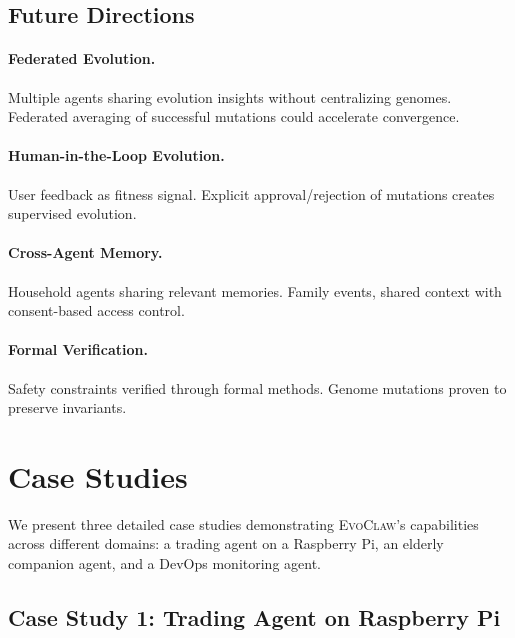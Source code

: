 \documentclass{article}
\newcommand{\evoclaw}{\textsc{EvoClaw}}
\begin{document}
\subsection{Future Directions}

\paragraph{Federated Evolution.} Multiple agents sharing evolution insights without centralizing genomes. Federated averaging of successful mutations could accelerate convergence.

\paragraph{Human-in-the-Loop Evolution.} User feedback as fitness signal. Explicit approval/rejection of mutations creates supervised evolution.

\paragraph{Cross-Agent Memory.} Household agents sharing relevant memories. Family events, shared context with consent-based access control.

\paragraph{Formal Verification.} Safety constraints verified through formal methods. Genome mutations proven to preserve invariants.



\section{Case Studies}
\label{sec:casestudies}

We present three detailed case studies demonstrating \evoclaw{}'s capabilities across different domains: a trading agent on a Raspberry Pi, an elderly companion agent, and a DevOps monitoring agent.

\subsection{Case Study 1: Trading Agent on Raspberry Pi}
\end{document}
